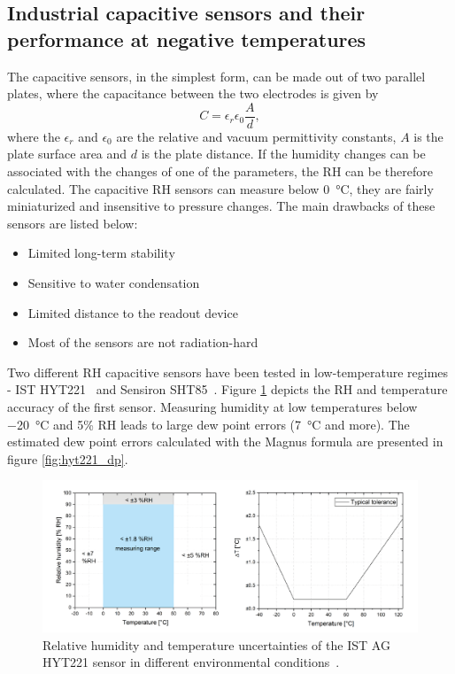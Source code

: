 \subsection{Industrial capacitive sensors and their performance at negative temperatures}
\label{capacitive_sensors}
The capacitive sensors, in the simplest form, can be made out of two parallel plates, where the capacitance between the two electrodes is given by
\begin{equation}
C = \epsilon_{r}\epsilon_0\frac{A}{d},
\end{equation}
where the $\epsilon_{r}$ and $\epsilon_{0}$ are the relative and vacuum permittivity constants, $A$ is the plate surface area and $d$ is the plate distance. If the humidity changes can be associated with the changes of one of the parameters, the \gls{RH} can be therefore calculated. 
The capacitive \gls{RH} sensors can measure below \SI{0}{\celsius}, they are fairly miniaturized and insensitive to pressure changes. The main drawbacks of these sensors are listed below:
\begin{itemize}
    \item Limited long-term stability
    \item Sensitive to water condensation
    \item Limited distance to the readout device
    \item Most of the sensors are not radiation-hard
\end{itemize}
Two different \gls{RH} capacitive sensors have been tested in low-temperature regimes - IST HYT221~\cite{hyt221} and Sensiron SHT85~\cite{SHT85}. Figure \ref{fig:hyt221} depicts the \gls{RH} and temperature accuracy of the first sensor. Measuring humidity at low temperatures below \SI{-20}{\celsius} and 5\% \gls{RH} leads to large dew point errors (\SI{7}{\celsius} and more). The estimated dew point errors calculated with the Magnus formula are presented in figure \ref{fig:hyt221_dp}.
\begin{figure}[!h]
\centering
\includegraphics[width=0.9\columnwidth]{Chapter5/images/hyt221_rh.png}
\caption{Relative humidity and temperature uncertainties of the IST AG HYT221 sensor in different environmental conditions~\cite{hyt221}.}
\label{fig:hyt221}
\end{figure}
